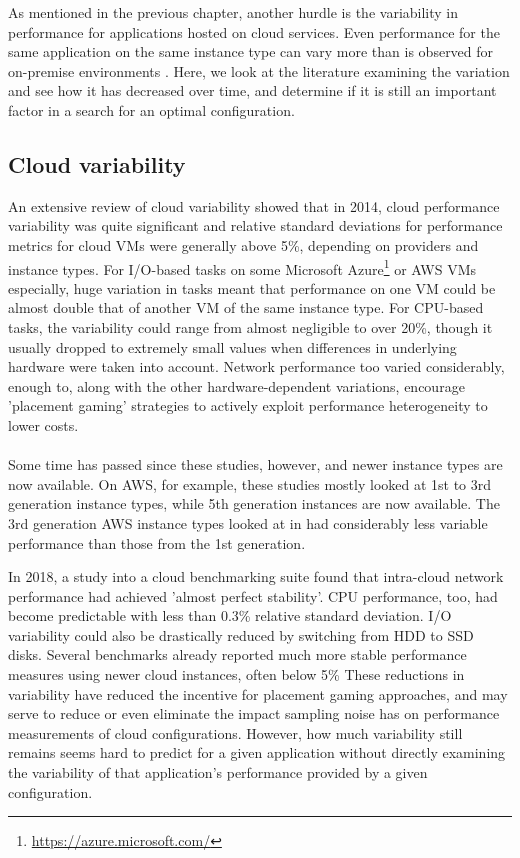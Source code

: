 \documentclass{report}
\begin{document}
As mentioned in the previous chapter, another hurdle is the variability in performance for applications hosted on cloud services. Even performance for the same application on the same instance type can vary more than is observed for on-premise environments \cite{Leitner2014}. Here, we look at the literature examining the variation and see how it has decreased over time, and determine if it is still an important factor in a search for an optimal configuration.

\subsection{Cloud variability}
An extensive review of cloud variability showed that in 2014, cloud performance variability was quite significant and relative standard deviations for performance metrics for cloud VMs were generally above 5\%, depending on providers and instance types\cite{Leitner2014}. For I/O-based tasks on some Microsoft Azure\footnote{\url{https://azure.microsoft.com/}} or AWS VMs especially, huge variation in tasks meant that performance on one VM could be almost double that of another VM of the same instance type. For CPU-based tasks, the variability could range from almost negligible to over 20\%, though it usually dropped to extremely small values when differences in underlying hardware were taken into account. Network performance too varied considerably, enough to, along with the other hardware-dependent variations, encourage 'placement gaming' strategies to actively exploit performance heterogeneity to lower costs\cite{Farley2012}.

\paragraph{}
Some time has passed since these studies, however, and newer instance types are now available. On AWS, for example, these studies mostly looked at 1st to 3rd generation instance types, while 5th generation instances are now available. The 3rd generation AWS instance types looked at in \cite{Leitner2014} had considerably less variable performance than those from the 1st generation.

In 2018, a study into a cloud benchmarking suite found that intra-cloud network performance had achieved 'almost perfect stability'\cite{Scheuner2018, Scheuner2018a}. CPU performance, too, had become predictable with less than 0.3\% relative standard deviation\cite{Scheuner2018}. I/O variability could also be drastically reduced by switching from HDD to SSD disks. Several benchmarks already reported much more stable performance measures using newer cloud instances, often below 5\%\cite{Davatz2017, Laaber2019} These reductions in variability have reduced the incentive for placement gaming approaches, and may serve to reduce or even eliminate the impact sampling noise has on performance measurements of cloud configurations. However, how much variability still remains seems hard to predict for a given application without directly examining the variability of that application's performance provided by a given configuration.
\end{document}
